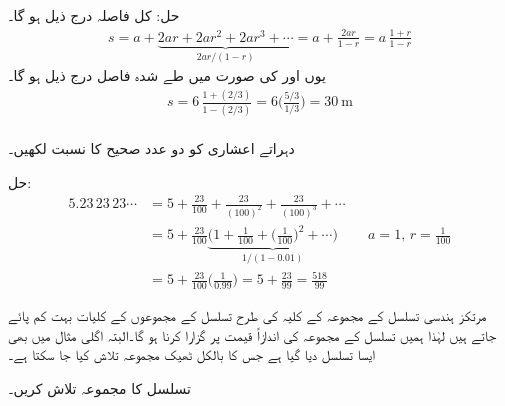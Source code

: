 حل:\quad
کل فاصلہ درج ذیل ہو گا۔
\begin{align*}
s=a+\underbrace{2ar+2ar^2+2ar^3+\cdots}_{2ar/(1-r)}=a+\frac{2ar}{1-r}=a\,\frac{1+r}{1-r}
\end{align*}
یوں  اور  کی صورت میں طے شدہ فاصل درج ذیل ہو گا۔
\begin{align*}
s=6\,\frac{1+(2/3)}{1-(2/3)}=6\big(\frac{5/3}{1/3}\big)=\SI{30}{\meter}
\end{align*} 
\\
دہراتے اعشاری  کو دو عدد صحیح کا نسبت لکھیں۔

حل:\quad
\begin{align*}
5.23\,23\,23\cdots&=5+\frac{23}{100}+\frac{23}{(100)^2}+\frac{23}{(100)^3}+\cdots\\
&=5+\frac{23}{100}\underbrace{\big(1+\frac{1}{100}+\big(\frac{1}{100}\big)^2+\cdots\big)}_{1/(1-0.01)}&&a=1,\, r=\tfrac{1}{100}\\
&=5+\frac{23}{100}\big(\frac{1}{0.99}\big)=5+\frac{23}{99}=\frac{518}{99}
\end{align*}

مرتکز ہندسی تسلسل کے مجموعہ کے کلیہ کی طرح تسلسل کے مجموعوں کے کلیات بہت کم پائے جاتے ہیں لہٰذا ہمیں تسلسل کے مجموعہ کی اندازاً قیمت پر گزارا کرنا ہو گا۔البتہ اگلی مثال میں بھی ایسا تسلسل دیا گیا ہے جس کا بالکل ٹھیک  مجموعہ تلاش کیا جا سکتا ہے۔

تسلسل  کا مجموعہ تلاش کریں۔

